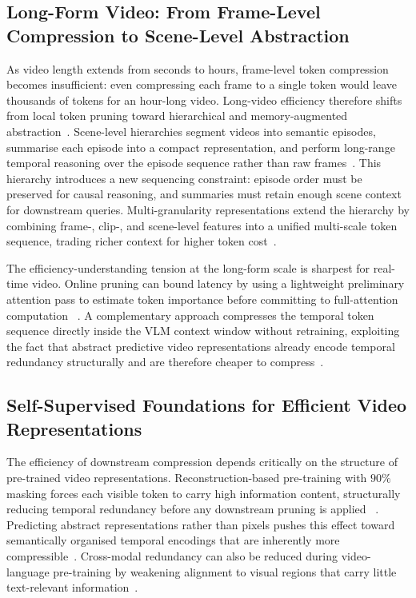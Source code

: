 \documentclass[10pt]{article}
\begin{document}
\subsection{Long-Form Video: From Frame-Level Compression to Scene-Level Abstraction}

As video length extends from seconds to hours, frame-level token compression becomes
insufficient: even compressing each frame to a single token would leave thousands of
tokens for an hour-long video.  Long-video efficiency therefore shifts from local
token pruning toward hierarchical and memory-augmented abstraction~\citep{zou2024secondshoursreviewingmultimodal}.
Scene-level hierarchies segment videos into semantic episodes, summarise each episode
into a compact representation, and perform long-range temporal reasoning over the
episode sequence rather than raw frames~\citep{faure2025hermestemporalcoherentlongformunderstanding}.  This
hierarchy introduces a new sequencing constraint: episode order must be preserved for
causal reasoning, and summaries must retain enough scene context for downstream
queries.  Multi-granularity representations extend the hierarchy by combining frame-,
clip-, and scene-level features into a unified multi-scale token sequence, trading
richer context for higher token cost~\citep{li2026mmvirmultimodalmultigranularityrepresentation}.

The efficiency-understanding tension at the long-form scale is sharpest for real-time
video.  Online pruning can bound latency by using a lightweight preliminary attention
pass to estimate token importance before committing to full-attention computation
~\citep{jin2025streamingassistantefficientvisualtoken}.  A complementary approach compresses the temporal token
sequence directly inside the VLM context window without retraining, exploiting the
fact that abstract predictive video representations already encode temporal
redundancy structurally and are therefore cheaper to compress~\citep{wang2025lvclightweightcompressionframework,drozdov2024videorepresentationlearningjointembedding}.

\subsection{Self-Supervised Foundations for Efficient Video Representations}

The efficiency of downstream compression depends critically on the structure of
pre-trained video representations.  Reconstruction-based pre-training with $90\%$
masking forces each visible token to carry high information content, structurally
reducing temporal redundancy before any downstream pruning is applied
~\citep{tong2022videomaemaskedautoencodersdataefficient}.  Predicting abstract representations rather than pixels pushes
this effect toward semantically organised temporal encodings that are inherently more
compressible~\citep{drozdov2024videorepresentationlearningjointembedding}.  Cross-modal redundancy can also be reduced during
video-language pre-training by weakening alignment to visual regions that carry little
text-relevant information~\citep{wu2022rapredundancyawarevideolanguagepretraining}.
\end{document}
